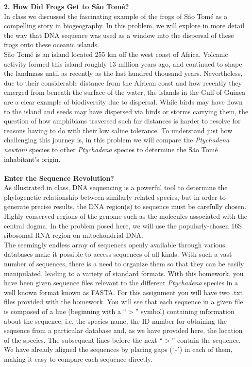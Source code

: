 {\bf{2. How Did Frogs Get to S\~{a}o Tom\'{e}?}}\\


In class we discussed the fascinating example of the frogs of S\~ao Tom\'e as a
compelling story in biogeography.  In this problem, we will explore in more
detail the way that DNA sequence was used as a window into the dispersal of
these frogs onto these oceanic islands.\\

S\~ao Tom\'e is an island located 255 km off the west coast of Africa. Volcanic
activity formed this island roughly 13 million years ago, and continued to shape
the landmass until as  recently as the last hundred thousand years.
Nevertheless, due to their considerable distance from the African coast and how
recently they emerged from beneath the surface of the water, the islands in the
Gulf of Guinea are  a clear example of biodiversity due to dispersal. While
birds may have flown to the island and seeds may have dispersed via birds or
storms carrying them, the question of how amphibians traversed such far
distances is harder to resolve for reasons having to do with their low saline
tolerance. To understand just how challenging this journey is, in this problem
we will compare the \emph{Ptychadena newtoni} species to other \emph{Ptychadena}
species to determine  the S\~ao Tom\'e inhabitant's origin.\\
\\
\newline
\textbf{Enter the Sequence Revolution?}\\

As illustrated in class, DNA sequencing is a powerful tool to determine the
phylogenetic relationship between similarly related species, but in order to
generate precise results,  the DNA region(s) to sequence must be carefully
chosen. Highly conserved regions of the genome such as the molecules associated
with the central dogma. In the problem posed here, we will use the
popularly-chosen 16S ribosomal RNA region on mitochondrial DNA. \\

The seemingly endless array of sequences openly available through various
databases make it possible to access sequences of all kinds. With such a vast
number of sequences, there is a need to organize them so that they can be easily
manipulated,  leading to a variety of standard formats. With this homework, you
have been given sequence files relevant to the different \emph{Ptychadena}
species in a well known format known as FASTA.  For this assignment you will
have  two .txt files provided with the homework.  You will see that each
sequence in a given  file is composed of a line (beginning with a ``$>$''
symbol) containing information about the sequence, i.e. the species name, the ID
number for obtaining the sequence from a particular database  and, as we have
provided here, the location of the species.  The subsequent lines before the
next ``$>$'' contain the sequence. We have already  aligned the sequences by
placing gaps (`\texttt{-}')  in each of them, making it easy to compare each
sequence directly. \\

